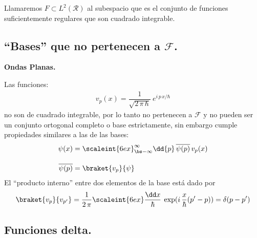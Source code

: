Llamaremos $F \subset L^{2} (\mathcal{R})$ al subespacio que es el conjunto de funciones suficientemente regulares que son cuadrado integrable.

\subsection{\enquote{Bases} que no pertenecen a \texorpdfstring{$\mathcal{F}$}{F}.}

\noindent
\textbf{Ondas Planas.}

Las funciones:
\begin{align*}
v_{p}(x) = \dfrac{1}{\sqrt{2 \, \pi \, \hbar}} \: e^{i \, p \, x / \hbar}
\end{align*}
no son de cuadrado integrable, por lo tanto no pertenecen a $\mathcal{F}$ y no pueden ser un conjunto ortogonal completo o base estrictamente, sin embargo cumple propiedades similares a las de las bases:
\begin{align*}
\psi (x) &= \scaleint{6ex}_{\bs -\infty}^{\infty} \dd{p} \, \overline{\psi (p)} \, v_{p} (x) \\[1em]
\overline{\psi (p)} &= \braket{v_{p}}{\psi}
\end{align*}
El \enquote{producto interno} entre dos elementos de la base está dado por
\begin{align*}
\braket{v_{p}}{v_{p^{\prime}}} = \dfrac{1}{2 \, \pi} \scaleint{6ex} \dfrac{\dd x}{\hbar} \: \exp(i \, \frac{x}{\hbar}(p^{\prime} - p)) = \delta (p - p^{\prime})
\end{align*}

\subsection*{Funciones delta.}

